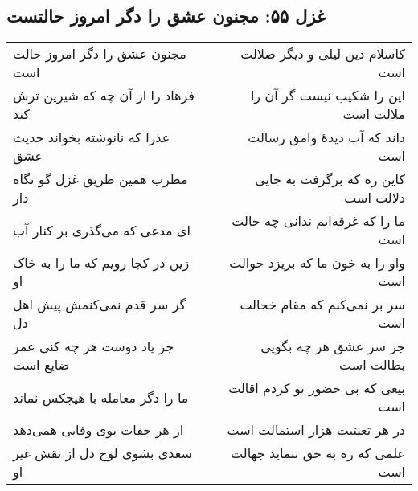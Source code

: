 \begin{center}
\section*{غزل ۵۵: مجنون عشق را دگر امروز حالتست}
\label{sec:055}
\begin{longtable}{l p{0.5cm} r}
مجنون عشق را دگر امروز حالت است
&&
کاسلام دین لیلی و دیگر ضلالت است
\\
فرهاد را از آن چه که شیرین ترش کند
&&
این را شکیب نیست گر آن را ملالت است
\\
عذرا که نانوشته بخواند حدیث عشق
&&
داند که آب دیدهٔ وامق رسالت است
\\
مطرب همین طریق غزل گو نگاه دار
&&
کاین ره که برگرفت به جایی دلالت است
\\
ای مدعی که می‌گذری بر کنار آب
&&
ما را که غرقه‌ایم ندانی چه حالت است
\\
زین در کجا رویم که ما را به خاک او
&&
واو را به خون ما که بریزد حوالت است
\\
گر سر قدم نمی‌کنمش پیش اهل دل
&&
سر بر نمی‌کنم که مقام خجالت است
\\
جز یاد دوست هر چه کنی عمر ضایع است
&&
جز سر عشق هر چه بگویی بطالت است
\\
ما را دگر معامله با هیچکس نماند
&&
بیعی که بی حضور تو کردم اقالت است
\\
از هر جفات بوی وفایی همی‌دهد
&&
در هر تعنتیت هزار استمالت است
\\
سعدی بشوی لوح دل از نقش غیر او
&&
علمی که ره به حق ننماید جهالت است
\\
\end{longtable}
\end{center}
